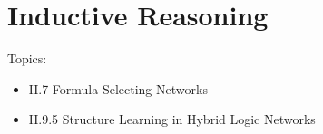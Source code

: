 \chapter{Inductive Reasoning}


Topics:
\begin{itemize}
    \item II.7 Formula Selecting Networks
    \item II.9.5 Structure Learning in Hybrid Logic Networks
\end{itemize}
